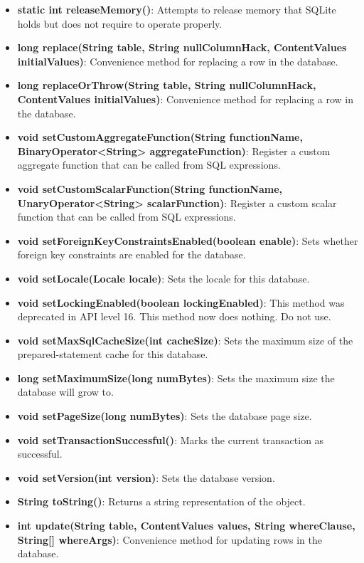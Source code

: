 \documentclass{report}
\begin{document}
\begin{itemize}
\begin{itemize}
\begin{itemize}
                \item \textbf{static int	releaseMemory()}: Attempts to release memory that SQLite holds but does not require to operate properly.
                \item \textbf{long	replace(String table, String nullColumnHack, ContentValues initialValues)}: Convenience method for replacing a row in the database.
                \item \textbf{long	replaceOrThrow(String table, String nullColumnHack, ContentValues initialValues)}: Convenience method for replacing a row in the database.
                \item \textbf{void	setCustomAggregateFunction(String functionName, BinaryOperator<String> aggregateFunction)}: Register a custom aggregate function that can be called from SQL expressions.
                \item \textbf{void	setCustomScalarFunction(String functionName, UnaryOperator<String> scalarFunction)}: Register a custom scalar function that can be called from SQL expressions.
                \item \textbf{void	setForeignKeyConstraintsEnabled(boolean enable)}: Sets whether foreign key constraints are enabled for the database.
                \item \textbf{void	setLocale(Locale locale)}: Sets the locale for this database.
                \item \textbf{void	setLockingEnabled(boolean lockingEnabled)}: This method was deprecated in API level 16. This method now does nothing. Do not use.
                \item \textbf{void	setMaxSqlCacheSize(int cacheSize)}: Sets the maximum size of the prepared-statement cache for this database.
                \item \textbf{long	setMaximumSize(long numBytes)}: Sets the maximum size the database will grow to.
                \item \textbf{void	setPageSize(long numBytes)}: Sets the database page size.
                \item \textbf{void	setTransactionSuccessful()}: Marks the current transaction as successful.
                \item \textbf{void	setVersion(int version)}: Sets the database version.
                \item \textbf{String	toString()}: Returns a string representation of the object.
                \item \textbf{int	update(String table, ContentValues values, String whereClause, String[] whereArgs)}: Convenience method for updating rows in the database.

\end{itemize}
\end{itemize}
\end{itemize}
\end{document}
